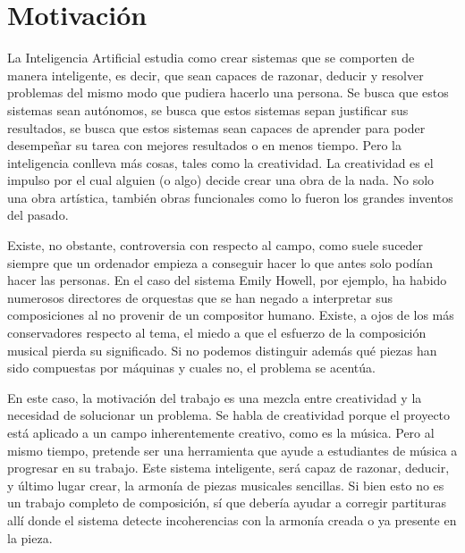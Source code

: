 \section{Motivación}

La Inteligencia Artificial estudia como crear sistemas que se comporten de manera inteligente, es decir, que sean capaces de razonar, deducir y resolver problemas del mismo modo que pudiera hacerlo una persona. Se busca que estos sistemas sean autónomos, se busca que estos sistemas sepan justificar sus resultados, se busca que estos sistemas sean capaces de aprender para poder desempeñar su tarea con mejores resultados o en menos tiempo. Pero la inteligencia conlleva más cosas, tales como la creatividad. La creatividad es el impulso por el cual alguien (o algo) decide crear una obra de la nada. No solo una obra artística, también obras funcionales como lo fueron los grandes inventos del pasado. 

Existe, no obstante, controversia con respecto al campo, como suele suceder siempre que un ordenador empieza a conseguir hacer lo que antes solo podían hacer las personas. En el caso del sistema Emily Howell, por ejemplo, ha habido numerosos directores de orquestas que se han negado a interpretar sus composiciones al no provenir de un compositor humano. Existe, a ojos de los más conservadores respecto al tema, el miedo a que el esfuerzo de la composición musical pierda su significado. Si no podemos distinguir además qué piezas han sido compuestas por máquinas y cuales no, el problema se acentúa. 

En este caso, la motivación del trabajo es una mezcla entre creatividad y la necesidad de solucionar un problema. Se habla de creatividad porque el proyecto está aplicado a un campo inherentemente creativo, como es la música. Pero al mismo tiempo, pretende ser una herramienta que ayude a estudiantes de música a progresar en su trabajo. Este sistema inteligente, será capaz de razonar, deducir, y último lugar crear, la armonía de piezas musicales sencillas. Si bien esto no es un trabajo completo de composición, sí que debería ayudar a corregir partituras allí donde el sistema detecte incoherencias con la armonía creada o ya presente en la pieza. 


